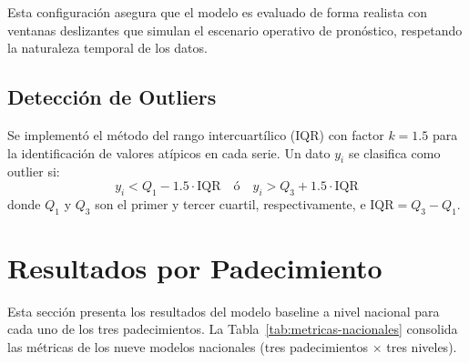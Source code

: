 \documentclass[11pt,a4paper]{article}
\begin{document}
Esta configuración asegura que el modelo es evaluado de forma realista con ventanas deslizantes que simulan el escenario operativo de pronóstico, respetando la naturaleza temporal de los datos.

\subsection{Detección de Outliers}\label{sec:outliers}

Se implementó el método del rango intercuartílico (IQR) \citep{tukey1977exploratory} con factor $k=1.5$ para la identificación de valores atípicos en cada serie. Un dato $y_i$ se clasifica como outlier si:
\begin{equation}
y_i < Q_1 - 1.5 \cdot \text{IQR} \quad \text{ó} \quad y_i > Q_3 + 1.5 \cdot \text{IQR}
\label{eq:iqr}
\end{equation}
donde $Q_1$ y $Q_3$ son el primer y tercer cuartil, respectivamente, e $\text{IQR} = Q_3 - Q_1$.

\section{Resultados por Padecimiento}\label{sec:resultados}

Esta sección presenta los resultados del modelo baseline a nivel nacional para cada uno de los tres padecimientos. La Tabla~\ref{tab:metricas-nacionales} consolida las métricas de los nueve modelos nacionales (tres padecimientos $\times$ tres niveles).
\end{document}
